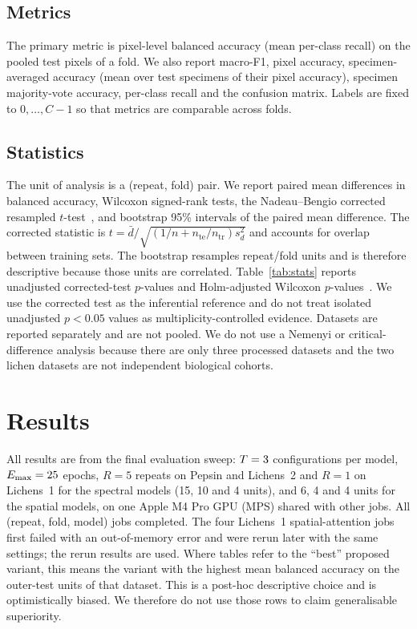 \documentclass[journal]{IEEEtran}
\begin{document}
\subsection{Metrics}
The primary metric is pixel-level balanced accuracy (mean per-class recall) on the pooled test pixels of a fold. We also report macro-F1, pixel accuracy, specimen-averaged accuracy (mean over test specimens of their pixel accuracy), specimen majority-vote accuracy, per-class recall and the confusion matrix. Labels are fixed to $0,\dots,C-1$ so that metrics are comparable across folds.

\subsection{Statistics}
The unit of analysis is a (repeat, fold) pair. We report paired mean differences in balanced accuracy, Wilcoxon signed-rank tests, the Nadeau--Bengio corrected resampled $t$-test~\cite{nadeau2003inference}, and bootstrap 95\% intervals of the paired mean difference. The corrected statistic is $t=\bar d/\sqrt{(1/n+n_{\mathrm{te}}/n_{\mathrm{tr}})s_d^2}$ and accounts for overlap between training sets. The bootstrap resamples repeat/fold units and is therefore descriptive because those units are correlated. Table~\ref{tab:stats} reports unadjusted corrected-test $p$-values and Holm-adjusted Wilcoxon $p$-values~\cite{holm1979simple}. We use the corrected test as the inferential reference and do not treat isolated unadjusted $p<0.05$ values as multiplicity-controlled evidence. Datasets are reported separately and are not pooled. We do not use a Nemenyi or critical-difference analysis because there are only three processed datasets and the two lichen datasets are not independent biological cohorts.

\section{Results}\label{sec:results}
All results are from the final evaluation sweep: $T=3$ configurations per model, $E_{\max}=25$ epochs, $R=5$ repeats on Pepsin and Lichens~2 and $R=1$ on Lichens~1 for the spectral models (15, 10 and 4 units), and 6, 4 and 4 units for the spatial models, on one Apple M4 Pro GPU (MPS) shared with other jobs. All (repeat, fold, model) jobs completed. The four Lichens~1 spatial-attention jobs first failed with an out-of-memory error and were rerun later with the same settings; the rerun results are used. Where tables refer to the ``best'' proposed variant, this means the variant with the highest mean balanced accuracy on the outer-test units of that dataset. This is a post-hoc descriptive choice and is optimistically biased. We therefore do not use those rows to claim generalisable superiority.
\end{document}
